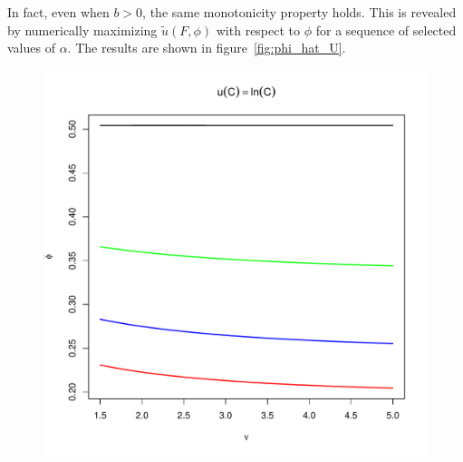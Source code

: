 \documentclass[11pt,a4]{amsart}
\newcommand{\wt}{\widetilde}
\newcommand{\1}{{\mathbf 1}}
\begin{document}
In fact, even when $b > 0$, the same monotonicity property holds. This
is revealed by numerically maximizing $\wt u(F, \phi)$ with
respect to $\phi$ for a sequence of selected values of $\alpha$. The
results are shown in figure~\ref{fig:phi_hat_U}.
\begin{figure}[htb!]
  \begin{minipage}{0.5\linewidth}
    \includegraphics[width=\textwidth]{phi_hat_b_t_log.pdf}

\end{minipage}
\end{figure}
\end{document}
